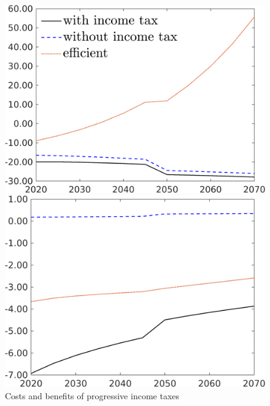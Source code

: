 \begin{figure}[h!!!]
	\centering
	\caption{Costs and benefits of progressive income taxes }\label{fig:optAll_percLf_dyn}
	\begin{minipage}[]{0.32\textwidth}
		\includegraphics[width=1\textwidth]{../../codding_model/own_basedOnFried/optimalPol_190722_tidiedUp/figures/all_10Aout22/C_PercentageLFDynNT_Target_regime3_spillover0_noskill0_sep1_xgrowth0_etaa0.79_lgd1.png}
	\end{minipage}
	\begin{minipage}[]{0.32\textwidth}
		\includegraphics[width=1\textwidth]{../../codding_model/own_basedOnFried/optimalPol_190722_tidiedUp/figures/all_10Aout22/hh_PercentageLfDynNT_Target_regime3_spillover0_noskill0_sep1_xgrowth0_PV1_etaa0.79_lgd0.png}

\end{minipage}
\end{figure}
